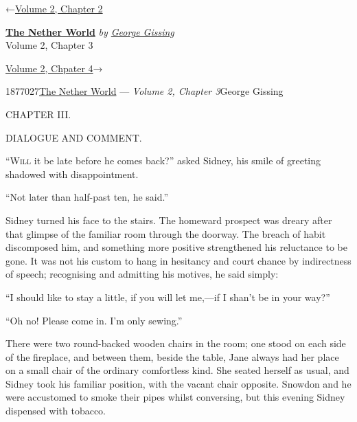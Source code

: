 \hypertarget{headerContainer}{}
\hypertarget{navigationHeader}{}
\protect\hypertarget{headerprevious}{}{←\href{/wiki/The_Nether_World/Volume_2/Chapter_2}{Volume
2, Chapter 2}}

\textbf{\protect\hypertarget{header_title_text}{}{\href{/wiki/The_Nether_World}{The
Nether World}}} \emph{by
\href{/wiki/Author:George_Gissing}{\protect\hypertarget{header_author_text}{}{{George
Gissing}}}}\\
\protect\hypertarget{header_section_text}{}{Volume 2, Chapter 3}

\protect\hypertarget{headernext}{}{\href{/wiki/The_Nether_World/Volume_2/Chapter_4}{Volume
2, Chpater 4}→}

\hypertarget{navigationNotes}{}

\hypertarget{ws-data}{}
\protect\hypertarget{ws-article-id}{}{1877027}\protect\hypertarget{ws-title}{}{\href{/wiki/The_Nether_World}{The
Nether World} --- \emph{Volume 2, Chapter
3}}\protect\hypertarget{ws-author}{}{George Gissing}

{\protect\hypertarget{42}{}{}}

{CHAPTER III.}

DIALOGUE AND COMMENT.

\textsc{``Will} it be late before he comes back?'' asked Sidney, his
smile of greeting shadowed with disappointment.

``Not later than half-past ten, he said.''

Sidney turned his face to the stairs. The homeward prospect was dreary
after that glimpse of the familiar room through the doorway. The breach
of habit discomposed him, and something more positive strengthened his
reluctance to be gone. It was not his custom to hang in hesitancy and
court chance by indirectness of speech; recognising and admitting his
motives, he said simply:

``I should like to stay a little, if you will let me,---if I shan't be
in your way?''

{\protect\hypertarget{43}{}{}}``Oh no! Please come in. I'm only
sewing.''

There were two round-backed wooden chairs in the room; one stood on each
side of the fireplace, and between them, beside the table, Jane always
had her place on a small chair of the ordinary comfortless kind. She
seated herself as usual, and Sidney took his familiar position, with the
vacant chair opposite. Snowdon and he were accustomed to smoke their
pipes whilst conversing, but this evening Sidney dispensed with tobacco.

